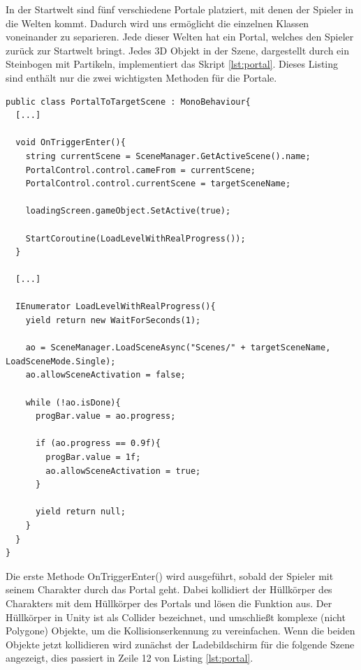 			In der Startwelt sind fünf verschiedene Portale platziert, mit denen der Spieler in die Welten kommt. Dadurch wird uns ermöglicht die einzelnen Klassen voneinander zu separieren. Jede dieser Welten hat ein Portal, welches den Spieler zurück zur Startwelt bringt. Jedes 3D Objekt in der Szene, dargestellt durch ein Steinbogen mit Partikeln, implementiert das Skript \ref{lst:portal}. Dieses Listing sind enthält nur die zwei wichtigsten Methoden für die Portale.

\begin{scriptsize}
	\lstset{
		float,
		caption=PortalToTargetScene, 
		language=[Sharp]C, 
		frame=single,  
		showstringspaces=false, 
		showspaces=false, 
		numbers=left, 
		captionpos=b, 
		belowcaptionskip=4pt,
		basicstyle=\ttfamily
	} 
	\begin{lstlisting}[label=lst:portal]
public class PortalToTargetScene : MonoBehaviour{
  [...]
	
  void OnTriggerEnter(){
    string currentScene = SceneManager.GetActiveScene().name;
    PortalControl.control.cameFrom = currentScene;
    PortalControl.control.currentScene = targetSceneName;
	
    loadingScreen.gameObject.SetActive(true);

    StartCoroutine(LoadLevelWithRealProgress());
  }
	
  [...]

  IEnumerator LoadLevelWithRealProgress(){
    yield return new WaitForSeconds(1);
	
    ao = SceneManager.LoadSceneAsync("Scenes/" + targetSceneName, LoadSceneMode.Single);
    ao.allowSceneActivation = false;

    while (!ao.isDone){
      progBar.value = ao.progress;
	
      if (ao.progress == 0.9f){
        progBar.value = 1f;
        ao.allowSceneActivation = true;
      }
	
      yield return null;
    }
  }
}
	\end{lstlisting}
\end{scriptsize}

			Die erste Methode OnTriggerEnter() wird ausgeführt, sobald der Spieler mit seinem Charakter durch das Portal geht. Dabei kollidiert der Hüllkörper des Charakters mit dem Hüllkörper des Portals und lösen die Funktion aus. Der Hüllkörper in Unity ist als Collider bezeichnet, und umschließt komplexe (nicht Polygone) Objekte, um die Kollisionserkennung zu vereinfachen. Wenn die beiden Objekte jetzt kollidieren wird zunächst der Ladebildschirm für die folgende Szene angezeigt, dies passiert in Zeile 12 von Listing \ref{lst:portal}. 
	
